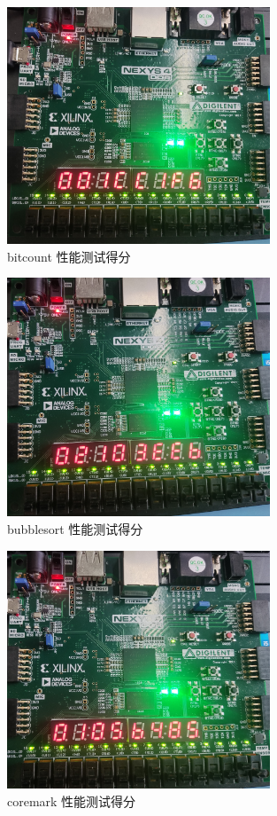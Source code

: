 \begin{figure}[htbp]
    \centering
    \includegraphics[width=0.7\textwidth]{image/per1.jpg}
    \caption{bitcount 性能测试得分}
    \label{fig:per1}
\end{figure}
\begin{figure}[htbp]
    \centering
    \includegraphics[width=0.7\textwidth]{image/per2.jpg}
    \caption{bubblesort 性能测试得分}
    \label{fig:per2}
\end{figure}
\begin{figure}[htbp]
    \centering
    \includegraphics[width=0.7\textwidth]{image/per3.jpg}
    \caption{coremark 性能测试得分}
    \label{fig:per3}
\end{figure}
